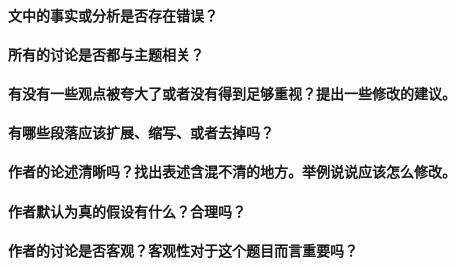 \documentclass[a4paper,12pt,onecolumn,songti]{article}
\begin{document}
		\paragraph{⽂中的事实或分析是否存在错误？}
		\paragraph{所有的讨论是否都与主题相关？}
		\paragraph{有没有⼀些观点被夸⼤了或者没有得到⾜够重视？提出⼀些修改的建议。}
		\paragraph{有哪些段落应该扩展、缩写、或者去掉吗？}
		\paragraph{作者的论述清晰吗？找出表述含混不清的地⽅。举例说说应该怎么修改。}
		\paragraph{作者默认为真的假设有什么？合理吗？}
		\paragraph{作者的讨论是否客观？客观性对于这个题目⽽言重要吗？}
\end{document}
